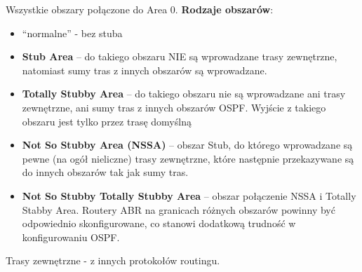 \documentclass[../main.tex]{subfiles}
\begin{document}
    Wszystkie obszary połączone do Area 0. \textbf{Rodzaje obszarów}:
    \begin{itemize}
        \item “normalne” - bez stuba
        \item \textbf{Stub Area} – do takiego obszaru NIE są wprowadzane trasy zewnętrzne, natomiast sumy tras z innych obszarów są wprowadzane.
        \item \textbf{Totally Stubby Area} – do takiego obszaru nie są wprowadzane ani trasy zewnętrzne, ani sumy tras z innych obszarów OSPF. Wyjście z takiego obszaru jest tylko przez trasę domyślną
        \item \textbf{Not So Stubby Area (NSSA)} – obszar Stub, do którego wprowadzane są pewne (na ogół nieliczne) trasy zewnętrzne, które następnie przekazywane są do innych obszarów tak jak sumy tras.
        \item \textbf{Not So Stubby Totally Stubby Area} – obszar połączenie NSSA i Totally Stabby Area. Routery ABR na granicach różnych obszarów powinny być odpowiednio skonfigurowane, co stanowi dodatkową trudność w konfigurowaniu OSPF.
    \end{itemize}
    Trasy zewnętrzne - z innych protokołów routingu.
\end{document}
